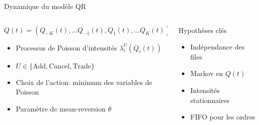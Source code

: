 \documentclass[aspectratio=169]{beamer}  %
\begin{document}
\begin{frame}{Dynamique du modèle QR}
    \begin{columns}
        \begin{column}{0.6\textwidth}
            \begin{equation*}
                Q(t) = (Q_{-K}(t),...Q_{-1}(t),Q_{1}(t),...Q_K(t))
            \end{equation*}
            \begin{itemize}
                \item Processus de Poisson d'intensités $\lambda_i^U(Q_i(t))$
                \item $U \in \{\text{Add}, \text{Cancel}, \text{Trade}\}$
                \item Choix de l'action: minimum des variables de Poisson
                \item Paramètre de mean-reversion $\theta$
            \end{itemize}
        \end{column}
        \begin{column}{0.4\textwidth}
            \begin{alertblock}{Hypothèses clés}
                \begin{itemize}
                    \item Indépendance des files
                    \item Markov en $Q(t)$
                    \item Intensités stationnaires
                    \item FIFO pour les ordres
                \end{itemize}
            \end{alertblock}
        \end{column}
    \end{columns}
\end{frame}
\end{document}
